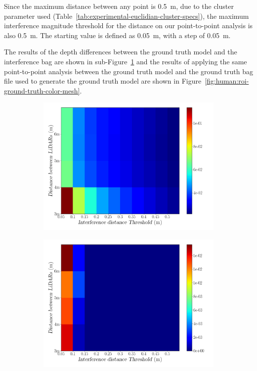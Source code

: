 Since the maximum distance between any point is \SI{0.5}{\meter}, due to the cluster parameter used (Table~\ref{tab:experimental-euclidian-cluster-specs}), the maximum interference magnitude threshold for the distance on our point-to-point analysis is also \SI{0.5}{\meter}. The starting value is defined as \SI{0.05}{\meter}, with a step of \SI{0.05}{\meter}.

The results of the depth differences between the ground truth model and the interference bag are shown in sub-Figure~\ref{fig:human:roi-interference-color-mesh} and the results of applying the same point-to-point analysis between the ground truth model and the ground truth bag file used to generate the ground truth model are shown in Figure~\ref{fig:human:roi-ground-truth-color-mesh}.

\begin{figure}[!ht]
	\centering
	\begin{subfigure}[c]{0.45\textwidth}
		\centering
		\includegraphics[width=\textwidth]{img/lidar-interference/human/interference_roi_distance_color_mesh.png}
		\caption{}
		\label{fig:human:roi-interference-color-mesh}
	\end{subfigure}
	\qquad
	\begin{subfigure}[c]{0.45\textwidth}
		\centering
		\includegraphics[width=\textwidth]{img/lidar-interference/human/ground_truth_roi_distance_color_mesh.png}

\end{subfigure}
\end{figure}

